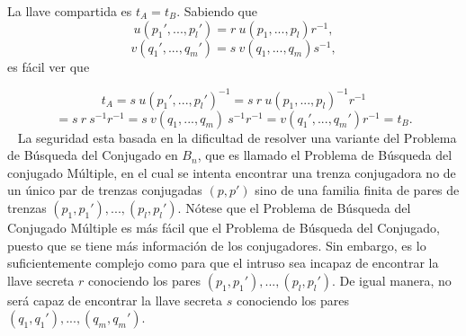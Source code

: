 \documentclass[12pt]{article}
\theoremstyle{definition}
\begin{document}
La llave compartida es $t_A = t_B$. Sabiendo que 
$$u(p_1',...,p_l')=r\ u(p_1,...,p_l)r^{-1},$$
$$v(q_1',...,q_m')=s\ v(q_1,...,q_m)s^{-1},$$
es fácil ver que

$$t_A = s\ u(p_1',...,p_l')^{-1} = s\ r\ u(p_1,...,p_l)^{-1}r^{-1}$$
$$=s\ r\ s^{-1}r^{-1}= s\ v(q_1,...,q_m)\ s^{-1}r^{-1}=v(q_1',...,q_m')r^{-1} = t_B.$$
\
\newline
La seguridad esta basada en la dificultad de resolver una variante del Problema de Búsqueda del Conjugado en $B_n$, que es llamado el Problema de Búsqueda del conjugado Múltiple, en el cual se intenta encontrar una trenza conjugadora no de un único par de trenzas conjugadas $(p,p')$ sino de una familia finita de pares de trenzas $(p_1,p_1'),...,(p_l,p_l')$. Nótese que el Problema de Búsqueda del Conjugado Múltiple es más fácil que el Problema de Búsqueda del Conjugado, puesto que se tiene más información de los conjugadores. Sin embargo, es lo suficientemente complejo como para que el intruso sea incapaz de encontrar la llave secreta $r$ conociendo los pares $(p_1,p_1'),...,(p_l,p_l')$. De igual manera, no será capaz de encontrar la llave secreta $s$ conociendo los pares $(q_1,q_1'),...,(q_m,q_m')$.
\end{document}
